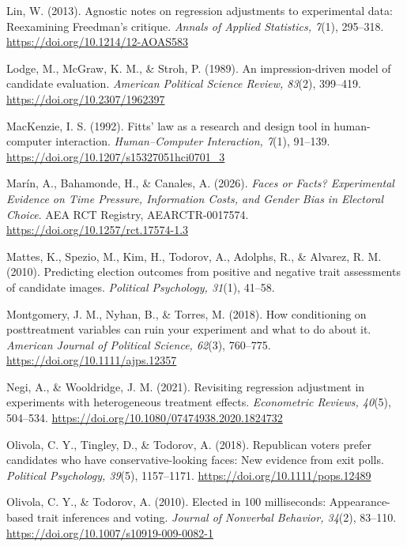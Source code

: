 \documentclass[11pt]{article}\usepackage[]{graphicx}\usepackage[]{xcolor}
\begin{document}
{\begin{list}{}{%
  \setlength{\leftmargin}{1.5em}%
  \setlength{\itemindent}{-1.5em}%
  \setlength{\itemsep}{0pt}%
  \setlength{\parsep}{0pt}%
  \setlength{\topsep}{1pt}%
}
\item Lin, W. (2013). Agnostic notes on regression adjustments to experimental data: Reexamining Freedman's critique. \emph{Annals of Applied Statistics, 7}(1), 295--318. \url{https://doi.org/10.1214/12-AOAS583}

\item Lodge, M., McGraw, K. M., \& Stroh, P. (1989). An impression-driven model of candidate evaluation. \emph{American Political Science Review, 83}(2), 399--419. \url{https://doi.org/10.2307/1962397}

\item MacKenzie, I. S. (1992). Fitts' law as a research and design tool in human-computer interaction. \emph{Human--Computer Interaction, 7}(1), 91--139. \url{https://doi.org/10.1207/s15327051hci0701_3}

\item Mar\'in, A., Bahamonde, H., \& Canales, A. (2026). \emph{Faces or Facts? Experimental Evidence on Time Pressure, Information Costs, and Gender Bias in Electoral Choice}. AEA RCT Registry, AEARCTR-0017574. \url{https://doi.org/10.1257/rct.17574-1.3}

\item Mattes, K., Spezio, M., Kim, H., Todorov, A., Adolphs, R., \& Alvarez, R. M. (2010). Predicting election outcomes from positive and negative trait assessments of candidate images. \emph{Political Psychology, 31}(1), 41--58.

\item Montgomery, J. M., Nyhan, B., \& Torres, M. (2018). How conditioning on posttreatment variables can ruin your experiment and what to do about it. \emph{American Journal of Political Science, 62}(3), 760--775. \url{https://doi.org/10.1111/ajps.12357}

\item Negi, A., \& Wooldridge, J. M. (2021). Revisiting regression adjustment in experiments with heterogeneous treatment effects. \emph{Econometric Reviews, 40}(5), 504--534. \url{https://doi.org/10.1080/07474938.2020.1824732}

\item Olivola, C. Y., Tingley, D., \& Todorov, A. (2018). Republican voters prefer candidates who have conservative-looking faces: New evidence from exit polls. \emph{Political Psychology, 39}(5), 1157--1171. \url{https://doi.org/10.1111/pops.12489}

\item Olivola, C. Y., \& Todorov, A. (2010). Elected in 100 milliseconds: Appearance-based trait inferences and voting. \emph{Journal of Nonverbal Behavior, 34}(2), 83--110. \url{https://doi.org/10.1007/s10919-009-0082-1}


\end{list}}
\end{document}
